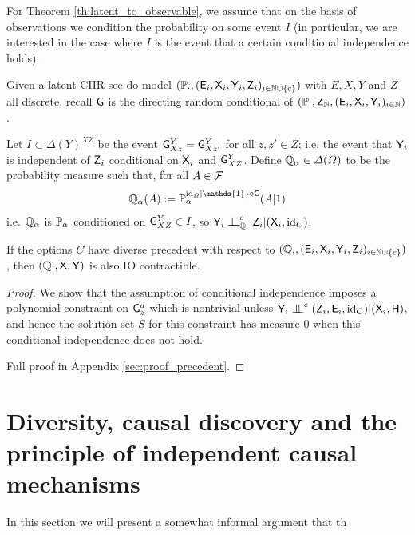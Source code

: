 For Theorem \ref{th:latent_to_observable}, we assume that on the basis of observations we condition the probability on some event $I$ (in particular, we are interested in the case where $I$ is the event that a certain conditional independence holds).

\begin{theorem}\label{th:latent_to_observable}
Given a latent CIIR see-do model $(\mathbb{P}_\cdot,(\mathsf{E}_i,\mathsf{X}_i,\mathsf{Y}_i,\mathsf{Z}_i)_{i\in\mathbb{N}\cup\{c\}})$ with $E,X,Y$ and $Z$ all discrete, recall $\mathsf{G}$ is the directing random conditional of $(\mathbb{P}_\cdot,\mathsf{Z}_{\mathbb{N}},(\mathsf{E}_i,\mathsf{X}_i,\mathsf{Y}_i)_{i\in \mathbb{N}})$.

Let $I\subset \Delta(Y)^{XZ}$ be the event $\mathsf{G}^Y_{Xz}=\mathsf{G}^Y_{Xz'}$ for all $z,z'\in Z$; i.e. the event that $\mathsf{Y}_i$ is independent of $\mathsf{Z}_i$ conditional on $\mathsf{X}_i$ and $\mathsf{G}^Y_{XZ}$. Define $\mathbb{Q}_\alpha\in \Delta(\Omega)$ to be the probability measure such that, for all $A\in \mathcal{F}$
\begin{align}
\prob{Q}_\alpha(A) := \prob{P}_\alpha^{\mathrm{id}_\Omega|\mathds{1}_I\circ \RV{G}}(A|1)
\end{align}
i.e. $\mathbb{Q}_\alpha$ is $\mathbb{P}_\alpha$ conditioned on $\mathsf{G}^Y_{XZ}\in I$, so $\RV{Y}_i\CI^e_{\prob{Q}_\cdot} \RV{Z}_i|(\RV{X}_i,\mathrm{id}_C)$.

If the options $C$ have diverse precedent with respect to $(\mathbb{Q}_\cdot,(\mathsf{E}_i,\mathsf{X}_i,\mathsf{Y}_i,\mathsf{Z}_i)_{i\in\mathbb{N}\cup\{c\}})$, then $(\mathbb{Q}_\cdot,\mathsf{X},\mathsf{Y})$ is also IO contractible.
\end{theorem}

\begin{proof}
We show that the assumption of conditional independence imposes a polynomial constraint on $\mathsf{G}^d_z$ which is nontrivial unless $\RV{Y}_i\CI^e (\RV{Z}_i,\RV{E}_i,\text{id}_C)|(\RV{X}_i,\RV{H})$, and hence the solution set $S$ for this constraint has measure 0 when this conditional independence does not hold.

Full proof in Appendix \ref{sec:proof_precedent}.
\end{proof}

\section{Diversity, causal discovery and the principle of independent causal mechanisms}

In this section we will present a somewhat informal argument that th

